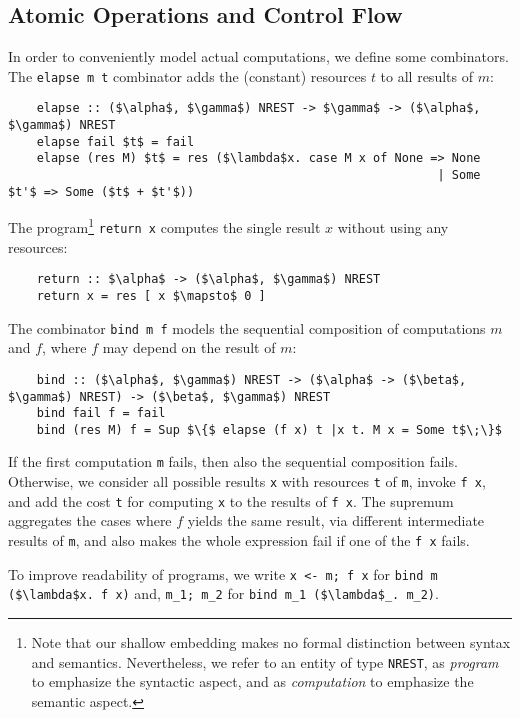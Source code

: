 \documentclass[acmsmall]{acmart}
\newcommand{\is}{\lstinline[language=isabelle]}
\begin{document}
\subsection{Atomic Operations and Control Flow}
In order to conveniently model actual computations, we define some combinators. 
The \is{elapse m t} combinator adds the (constant) resources $t$ to all results of $m$:
\begin{lstlisting}
    elapse :: ($\alpha$, $\gamma$) NREST -> $\gamma$ -> ($\alpha$, $\gamma$) NREST 
    elapse fail $t$ = fail
    elapse (res M) $t$ = res ($\lambda$x. case M x of None => None
                                                            | Some $t'$ => Some ($t$ + $t'$))
\end{lstlisting}
The program\cprotect\footnote{Note that our shallow embedding makes no formal distinction between syntax and semantics. Nevertheless, we refer to an entity of type \is{NREST}, as \emph{program} to emphasize the syntactic aspect, and as \emph{computation} to emphasize the semantic aspect.
} \is{return x} computes the single result $x$ without using any resources:
\begin{lstlisting}    
    return :: $\alpha$ -> ($\alpha$, $\gamma$) NREST 
    return x = res [ x $\mapsto$ 0 ]
\end{lstlisting}
The combinator \is{bind m f} models the sequential composition of computations $m$ and $f$, where $f$ may depend on the result of $m$:
\begin{lstlisting}    
    bind :: ($\alpha$, $\gamma$) NREST -> ($\alpha$ -> ($\beta$, $\gamma$) NREST) -> ($\beta$, $\gamma$) NREST 
    bind fail f = fail
    bind (res M) f = Sup $\{$ elapse (f x) t |x t. M x = Some t$\;\}$ 
\end{lstlisting}
If the first computation \is$m$ fails, then also the sequential composition fails. Otherwise, we consider all possible results \is$x$ with resources \is$t$ of \is$m$, invoke \is$f x$, and add the cost \is$t$ for computing \is$x$ to the results of \is$f x$. The supremum aggregates the cases where $f$ yields the same result, via different intermediate results of \is$m$, and also makes the whole expression fail if one of the \is$f x$ fails. 

To improve readability of programs, we write \is{x <- m; f x} for \is{bind m ($\lambda$x. f x)} and, \is{m_1; m_2} for \is{bind m_1 ($\lambda$_. m_2)}.


\end{document}
